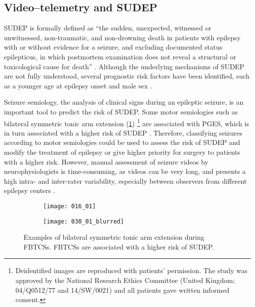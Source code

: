 \subsection{Video--telemetry and SUDEP}

\acs{SUDEP} is formally defined as ``the sudden, unexpected, witnessed or unwitnessed, non-traumatic, and non-drowning death in patients with epilepsy with or without evidence for a seizure, and excluding documented status epilepticus, in which postmortem examination does not reveal a structural or toxicological cause for death'' \cite{nashef_sudden_1997}.
Although the underlying mechanisms of \ac{SUDEP} are not fully understood, several prognostic risk factors have been identified, such as a younger age at epilepsy onset and male sex \cite{so_what_2008,jha_sudden_2021}.

Seizure semiology, the analysis of clinical signs during an epileptic seizure, is an important tool to predict the risk of \ac{SUDEP}.
Some motor semiologies such as bilateral symmetric tonic arm extension (\cref{fig:decerebration})%
\footnote{Deidentified images are reproduced with patients' permission. The study was approved by the National Research Ethics Committee (United Kingdom; 04/Q0512/77 and 14/SW/0021) and all patients gave written informed consent.} %
are associated with \ac{PGES}, which is in turn associated with a higher risk of \ac{SUDEP} \cite{alexandre_risk_2015,vilella_association_2021}.
Therefore, classifying seizures according to motor semiologies could be used to assess the risk of \ac{SUDEP} and modify the treatment of epilepsy or give higher priority for surgery to patients with a higher risk.
However, manual assessment of seizure videos by neurophysiologists is time-consuming, as videos can be very long, and presents a high intra- and inter-rater variability, especially between observers from different epilepsy centers \cite{tufenkjian_seizure_2012}.

\begin{figure}
  \centering

  \begin{subfigure}{0.49\linewidth}
    \texttt{[image: 016\_01]}
  \end{subfigure}
  \begin{subfigure}{0.49\linewidth}
    \texttt{[image: 030\_01\_blurred]}
  \end{subfigure}
  \caption[Examples of bilateral symmetric tonic arm extension]{
    Examples of bilateral symmetric tonic arm extension during \acfp*{FBTCS}.
    \Acp*{FBTCS} are associated with a higher risk of \acf*{SUDEP}.
  }
  \label{fig:decerebration}
\end{figure}

